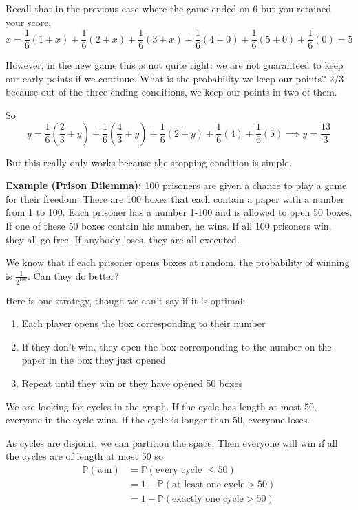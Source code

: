 \documentclass[12pt]{article}
\renewcommand{\P}{\mathbb{P}}
\begin{document}
    Recall that in the previous case where the game ended on 6 but you retained your score, 
    \[x = \frac{1}{6}(1 + x) + \frac{1}{6}(2 + x) + \frac{1}{6}(3 + x) + \frac{1}{6}(4 + 0) + \frac{1}{6}(5 + 0) + \frac{1}{6}(0) = 5\]

    However, in the new game this is not quite right: we are not guaranteed to keep our early points if we continue. What is the probability we keep our points? $2/3$ because out of the three ending conditions, we keep our points in two of them.

    So 
    \[y = \frac{1}{6}(\frac{2}{3} + y) + \frac{1}{6}(\frac{4}{3} + y) + \frac{1}{6}(2 + y) + \frac{1}{6}(4) + \frac{1}{6}(5) \implies \boxed{y = \frac{13}{3}}\]

    But this really only works because the stopping condition is simple. 

    \textbf{Example (Prison Dilemma):} 100 prisoners are given a chance to play a game for their freedom. There are 100 boxes that each contain a paper with a number from 1 to 100. Each prisoner has a number 1-100 and is allowed to open 50 boxes. If one of these 50 boxes contain his number, he wins. If all 100 prisoners win, they all go free. If anybody loses, they are all executed. 

    We know that if each prisoner opens boxes at random, the probability of winning is $\frac{1}{2^{100}}$. Can they do better?

    Here is one strategy, though we can't say if it is optimal: 
    \begin{enumerate}
        \item Each player opens the box corresponding to their number
        \item If they don't win, they open the box corresponding to the number on the paper in the box they just opened
        \item Repeat until they win or they have opened 50 boxes
    \end{enumerate}

    We are looking for cycles in the graph. If the cycle has length at most 50, everyone in the cycle wins. If the cycle is longer than 50, everyone loses.
    
    As cycles are disjoint, we can partition the space. Then everyone will win if all the cycles are of length at most 50 so 
    \begin{align*}
        \P(\text{win}) &= \P(\text{every cycle } \leq 50)\\
        &= 1 - \P(\text{at least one cycle} > 50)\\ 
        &= 1 - \P(\text{exactly one cycle} > 50)
    \end{align*}
\end{document}
